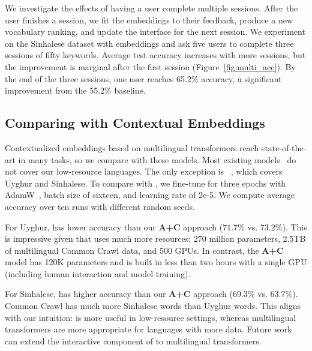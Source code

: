We investigate the effects of having a user complete multiple \name{} sessions.
After the user finishes a session, we fit the embeddings to their feedback,
produce a new vocabulary ranking, and update the interface for the next session.
We experiment on the Sinhalese dataset with  embeddings and ask five
users to complete three sessions of fifty keywords.
Average test accuracy increases with more sessions, but the improvement is
marginal after the first session (Figure~\ref{fig:multi_acc}).
By the end of the three sessions, one user reaches 65.2\% accuracy, a
significant improvement from the 55.2\% baseline.

\subsection{Comparing with Contextual Embeddings}
Contextualized embeddings based on multilingual transformers reach
state-of-the-art in many tasks,
so we compare \name{} with these models.
Most existing models~\citep{wu-19,lample-19}
do not cover our low-resource languages.
The only exception is ~\citep{conneau-20}, which covers Uyghur and
Sinhalese.
To compare with \name{}, we fine-tune  for three epochs with AdamW~\citep{loshchilov-2019}, batch size of sixteen, and learning
rate of 2e-5.  We compute average accuracy over ten runs with different random seeds.

For Uyghur,  has lower accuracy than our \textbf{A+C} approach ($71.7\%$ vs. $73.2\%$).
This is impressive given that  uses much more resources:
270 million parameters, 2.5TB of multilingual Common Crawl data, and 500 GPUs.
In contrast, the \textbf{A+C} model has 120K parameters and is built in less
than two hours with a single GPU (including human interaction and model
training).

For Sinhalese,  has higher accuracy than our \textbf{A+C} approach ($69.3\%$ vs. $63.7\%$).
Common Crawl has much more Sinhalese words than Uyghur words.
This aligns with our intuition: \name{} is more useful in low-resource settings, whereas multilingual transformers are more appropriate for languages with more data.
Future work can extend the interactive component of \name{} to multilingual transformers.
